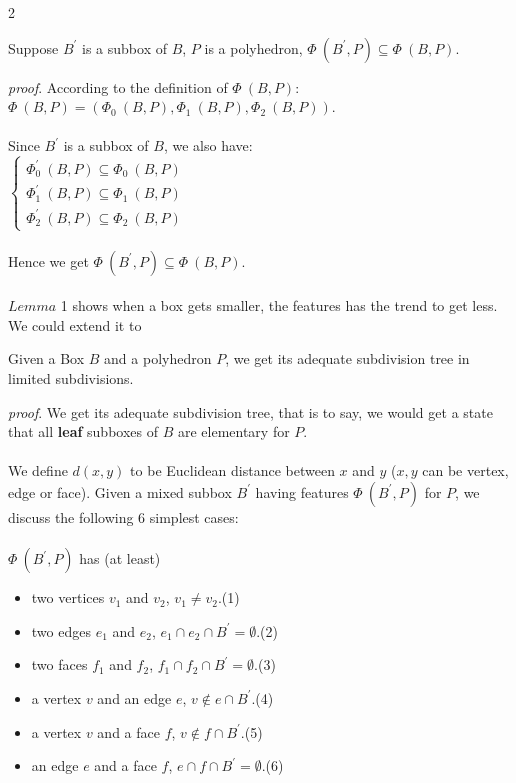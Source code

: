 \documentclass[twoside]{article}
\begin{document}
\begin{multicols}{2}
\begin{lemma}
Suppose $B^\prime$ is a subbox of $B$, $P$ is a polyhedron, $\Phi\ (B^\prime, P) \subseteq \Phi\ (B, P)$.
\end{lemma}
\textit{proof}. According to the definition of $\Phi\ (B, P)$:
\\
\indent
$\Phi\ (B, P) = ( \Phi_0\ (B, P), \Phi_1\ (B, P), \Phi_2\ (B, P) )$.
\\
\\
\indent Since $B^\prime$ is a subbox of $B$, we also have:
\\
\indent
$
    \left\{
    \begin{array}{c}
\Phi_0^\prime\ (B, P) \subseteq \Phi_0\ (B, P) \\
\Phi_1^\prime\ (B, P) \subseteq \Phi_1\ (B, P) \\
\Phi_2^\prime\ (B, P) \subseteq \Phi_2\ (B, P)
    \end{array}
    \right.
$
\\
\\
\indent
Hence we get $\Phi\ (B^\prime, P) \subseteq \Phi\ (B, P)$.
\\
\\
$Lemma$ 1 shows when a box gets smaller, the features has the trend to get less. We could extend it to
\begin{lemma}
Given a Box $B$ and a polyhedron $P$, we get its adequate subdivision tree in limited subdivisions.
\end{lemma}
\textit{proof}. We get its adequate subdivision tree, that is to say, we would get a state that all \textbf{leaf} subboxes of $B$ are elementary for $P$.
\\
\\
\indent We define $d(x,y)$ to be Euclidean distance between $x$ and $y$ ($x,y$ can be vertex, edge or face). Given a mixed subbox $B^\prime$ having features $\Phi\ (B^\prime, P)$ for $P$, we discuss the following 6 simplest cases:
\\
\\
$\Phi\ (B^\prime, P)$ has (at least)
		\begin{itemize}
			\item two vertices $v_1$ and $v_2$, $v_1 \neq v_2$.\hfill (1)
			\item two edges $e_1$ and $e_2$, $e_1 \cap e_2 \cap B^\prime = \emptyset$.\hfill (2)
			\item two faces $f_1$ and $f_2$, $f_1 \cap f_2 \cap B^\prime = \emptyset$.\hfill (3)
			\item a vertex $v$ and an edge $e$, $v \notin e \cap B^\prime$.\hfill (4)
			\item a vertex $v$ and a face $f$, $v \notin f \cap B^\prime$.\hfill (5)
			\item an edge $e$ and a face $f$, $e \cap f \cap B^\prime = \emptyset$.\hfill (6)
		\end{itemize}


\end{multicols}
\end{document}
